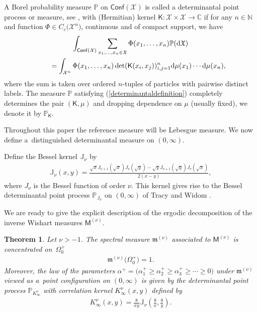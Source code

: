 \documentclass[pdftex]{sigma}
\numberwithin{equation}{section}
\newtheorem{Theorem}{Theorem}[section]
\begin{document}
A Borel probability measure $\mathbb{P}$ on $\mathsf{Conf}(\mathcal{X})$ is called a determinantal point process or measure, see \cite{Soshnikov}, with (Hermitian) kernel $\mathsf{K}\colon \mathcal{X} \times \mathcal{X} \to \mathbb{C}$ if for any $n\in \mathbb{N}$ and function $\Phi\in C_c\big(\mathcal{X}^n\big)$, continuous and of compact support, we have
\begin{gather}
\int_{\mathsf{Conf}(\mathcal{X})}^{} \sum_{x_1, \dots,x_n \in \mathfrak{X}}\Phi(x_1,\dots,x_n)\mathbb{P}({\rm d}\mathfrak{X})\nonumber\\
\qquad{} =\int_{\mathcal{X}^n}^{}\Phi(x_1,\dots,x_n)\det (\mathsf{K}(x_i,x_j) )_{i,j=1}^n{\rm d}\mu(x_1)\cdots {\rm d}\mu(x_n),\label{determinantaldefinition}
\end{gather}
where the sum is taken over ordered $n$-tuples of particles with pairwise distinct labels. The measure $\mathbb{P}$ satisfying (\ref{determinantaldefinition}) completely determines the pair $(\mathsf{K},\mu)$ and dropping dependence on $\mu$ (usually fixed), we denote it by $\mathbb{P}_{\mathsf{K}}$.

Throughout this paper the reference measure will be Lebesgue measure. We now define a~distinguished determinantal measure on $(0,\infty)$.

\begin{Definition}Define the Bessel kernel $\mathbb{J}_{\nu}$ by
\begin{gather*}
\mathbb{J}_{\nu}(x,y)=\frac{\sqrt{x}J_{\nu+1}(\sqrt{x})J_{\nu}(\sqrt{y})-\sqrt{y}J_{\nu+1}(\sqrt{y})J_{\nu}(\sqrt{x})}{2(x-y)},
\end{gather*}
where $J_{\nu}$ is the Bessel function of order $\nu$. This kernel gives rise to the Bessel determinantal point process $\mathbb{P}_{\mathbb{J}_{\nu}}$ on $(0,\infty)$ of Tracy and Widom \cite{TracyWidom}.
\end{Definition}

We are ready to give the explicit description of the ergodic decomposition of the inverse Wishart measures $\mathsf{M}^{(\nu)}$.

\begin{Theorem}\label{MainTheorem}
Let $\nu> -1$. The spectral measure $\mathfrak{m}^{(\nu)}$ associated to $\mathsf{M}^{(\nu)}$ is concentrated on~$\Omega_0^+$
\begin{gather*}
\mathfrak{m}^{(\nu)}\big(\Omega_0^+\big)=1.
\end{gather*}
Moreover, the law of the parameters $\alpha^+=\big(\alpha_1^+\ge \alpha_2^+ \ge \alpha_3^+ \ge \cdots \ge 0 \big)$ under $\mathfrak{m}^{(\nu)}$ viewed as a~point configuration on $(0,\infty)$ is given by the determinantal point process $\mathbb{P}_{K^{\nu}_{\infty}}$ with correlation kernel $K_{\infty}^{\nu}(x,y)$ defined by
\begin{gather*}
K_{\infty}^{\nu}(x,y)=\frac{8}{xy} \mathbb{J}_{\nu}\left(\frac{8}{x},\frac{8}{y}\right).
\end{gather*}
\end{Theorem}
\end{document}
